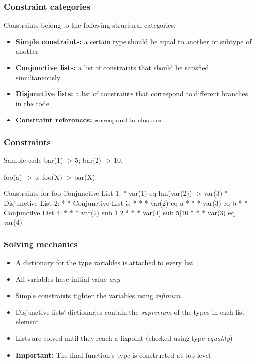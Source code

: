 \documentclass{beamer}
\begin{document}
\begin{frame}
  \frametitle{Constraint categories}
  Constraints belong to the following structural categories: \pause
  \begin{itemize}
  \item \textbf{Simple constraints:} a certain type should be equal to
    another or subtype of another \pause
  \item \textbf{Conjunctive lists:} a list of constraints that should be
    satisfied simultaneously \pause
  \item \textbf{Disjunctive lists:} a list of constraints that
    correspond to different branches in the code \pause
  \item \textbf{Constraint references:} correspond to closures
  \end{itemize}
\end{frame}

\begin{frame}[fragile]
  \frametitle{Constraints}
\begin{code}{Sample code}
bar(1) -> 5;
bar(2) -> 10.

foo(a) -> b;
foo(X) -> bar(X).
\end{code}
\begin{code}{Constraints for foo}
Conjunctive List 1:
 * var(1) eq fun(var(2)) -> var(3)
 * Disjunctive List 2:
 *  * Conjunctive List 3:
 *  *  * var(2) eq a
 *  *  * var(3) eq b
 *  * Conjunctive List 4:
 *  *  * var(2) sub 1|2
 *  *  * var(4) sub 5|10
 *  *  * var(3) eq var(4)
\end{code}
\end{frame}

\begin{frame}
  \frametitle{Solving mechanics}
  \begin{itemize}
  \item A dictionary for the type variables is attached to every
    list
  \item All variables have initial value \emph{any} \pause
  \item Simple constraints tighten the variables using \emph{infimum}
    \pause
  \item Disjunctive lists' dictionaries contain the \emph{supremum} of
    the types in each list element \pause
  \item Lists are solved until they reach a fixpoint (checked using
    type \emph{equality}) \pause
  \item \textbf{Important:} The final function's type is constructed
    at top level
  \end{itemize}
\end{frame}
\end{document}
